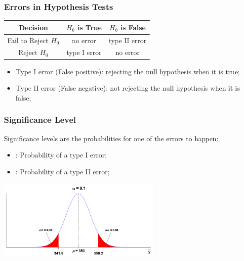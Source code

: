 \documentclass[10pt]{beamer}
\begin{document}
\begin{frame}
  \frametitle{Errors in Hypothesis Tests}
  
  \begin{center}
    \begin{tabular}{ccc}
      \hline
      Decision & $H_0$ is True & $H_0$ is False\\
      \hline
      Fail to Reject $H_0$ & no error & type II error\\
      Reject $H_0$ & type I error & no error\\
      \hline
    \end{tabular}
  \end{center}
  
  \bigskip

  \begin{itemize}
    \item Type I error (False positive): rejecting the null hypothesis
      when it is true; 
    \item Type II error (False negative): not rejecting the null
      hypothesis when it is false;
  \end{itemize}
\end{frame}

\begin{frame}
  \frametitle{Significance Level}

  \begin{block}{}
    Significance levels are the probabilities for one of the errors to happen:
    \begin{itemize}
    \item \structure{$\alpha$}: \alert<2>{Probability of a type I error;}
    \item \structure{$\beta$}: \alert<3>{Probability of a type II error;}
    \end{itemize}
  \end{block}

  \includegraphics[width=0.6\textwidth]{img/normaldist}

  \begin{block}{}
  \end{block}
\end{frame}
\end{document}
